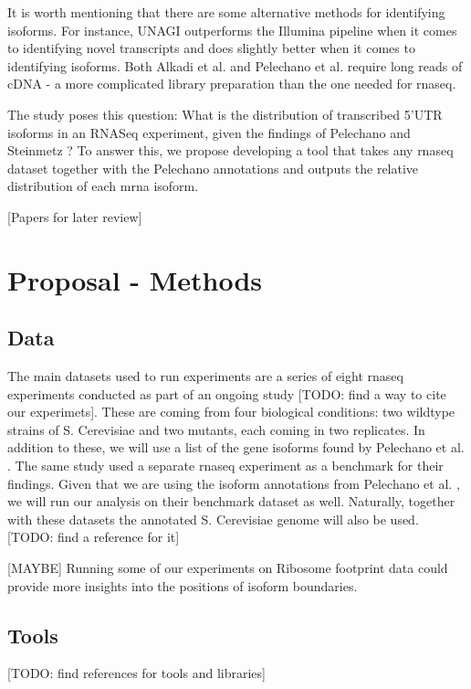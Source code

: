 \documentclass[12pt]{article}
\begin{document}
It is worth mentioning that there are some alternative methods for identifying isoforms. For instance, UNAGI\cite{Alkadi2020} outperforms the Illumina pipeline when it comes to identifying novel transcripts and does slightly better when it comes to identifying isoforms. Both Alkadi et al. \cite{Alkadi2020} and Pelechano et al. \cite{Pelechano2013} require long reads of cDNA - a more complicated library preparation than the one needed for \acrshort{rnaseq}.

The study poses this question: What is the distribution of transcribed 5’UTR isoforms in an RNASeq experiment, given the findings of Pelechano and Steinmetz \cite{Pelechano2013}? To answer this, we propose developing a tool that takes any \acrshort{rnaseq} dataset together with the Pelechano annotations and outputs the relative distribution of each \acrshort{mrna} isoform. 

{\tiny [Papers for later review]} \cite{Kim2009} \cite{Lee2002} \cite{ReixachsSol2020} \cite{Thorrez2008} 

\section{Proposal - Methods}\label{methods}
\subsection{Data}
The main datasets used to run experiments are a series of eight \acrshort{rnaseq} experiments conducted as part of an ongoing study {\tiny[TODO: find a way to cite our experimets]}. These are coming from four biological conditions: two wildtype strains of S. Cerevisiae and two mutants, each coming in two replicates. In addition to these, we will use a list of the gene isoforms found by Pelechano et al. \cite{Pelechano2013}. The same study \cite{Pelechano2013} used a separate \cite{Wilkening2013}  \acrshort{rnaseq} experiment as a benchmark for their findings. Given that we are using the isoform annotations from Pelechano et al. \cite{Pelechano2013}, we will run our analysis on their benchmark dataset as well. Naturally, together with these datasets the annotated S. Cerevisiae genome will also be used. {\tiny[TODO: find a reference for it]}

{\tiny[MAYBE]}
Running some of our experiments on Ribosome footprint data could provide more insights into the positions of isoform boundaries.

\subsection{Tools}\label{tools}
{\tiny[TODO: find references for tools and libraries]}
\end{document}
